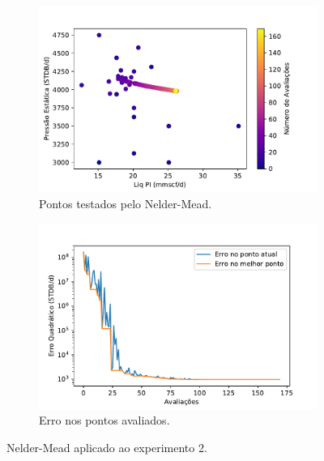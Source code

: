 \begin{figure}[H]
\centering
\begin{subfigure}{0.5\textwidth}
  \centering
  \includegraphics[width=1\linewidth]{figs/setup2_nm_points.pdf}
  \caption{Pontos testados pelo Nelder-Mead.}
  \label{fig:exp2_nm_points}
\end{subfigure}%
\begin{subfigure}{0.5\textwidth}
  \centering
  \includegraphics[width=1\linewidth]{figs/setup2_nm_errors.pdf}
  \caption{Erro nos pontos avaliados.}
  \label{fig:exp2_nm_error}
\end{subfigure}
\caption{Nelder-Mead aplicado ao experimento 2.}
\label{fig:exp2_nm}
\end{figure}





